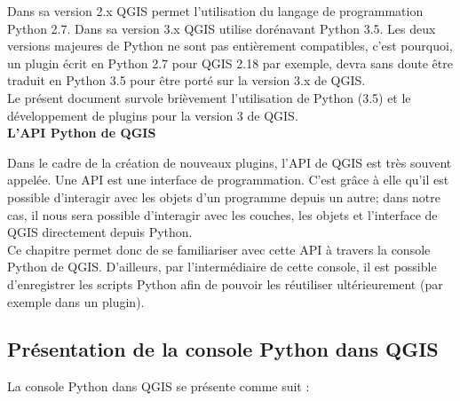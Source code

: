 \documentclass[11pt]{article}
\begin{document}
Dans sa version 2.x QGIS permet l'utilisation du langage de programmation Python 2.7. Dans sa version 3.x QGIS utilise dorénavant Python 3.5. Les deux versions majeures de Python ne sont pas entièrement compatibles, c'est pourquoi, un plugin écrit en Python 2.7 pour QGIS 2.18 par exemple, devra sans doute être traduit en Python 3.5 pour être porté sur la version 3.x de QGIS.\\

Le présent document survole brièvement l'utilisation de Python (3.5) et le développement de plugins pour la version 3 de QGIS. \\


\textbf{L'API Python de QGIS}\\\vspace*{-0.4em}

Dans le cadre de la création de nouveaux plugins, l'API de QGIS est très souvent appelée. Une API est une interface de programmation. C'est grâce à elle qu'il est possible d'interagir avec les objets d'un programme depuis un autre; dans notre cas, il nous sera possible d'interagir avec les couches, les objets et l'interface de QGIS directement depuis Python. \\

Ce chapitre permet donc de se familiariser avec cette API à travers la console Python de QGIS. D'ailleurs, par l'intermédiaire de cette console, il est possible d'enregistrer les scripts Python afin de pouvoir les réutiliser ultérieurement (par exemple dans un plugin). 


\subsection{Présentation de la console Python dans QGIS}
\label{Presentation}

La console Python dans QGIS se présente comme suit :
\end{document}
